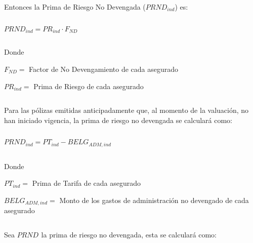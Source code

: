 \documentclass[11pt,twoside,openright,spanish]{report}
\numberwithin{equation}{chapter}
\numberwithin{figure}{chapter}
\numberwithin{table}{chapter}
\begin{document}
	
	\doublespacing

$ $

\doublespacing
	
	Entonces la Prima de Riesgo No Devengada ($PRND_{ind}$) es:
	
	\doublespacing

$ $

\doublespacing
	
		{\centering
		${PRND}_{ind}^{}={{PR}_{ind}\cdot F_{ND}}$
		\noindent
		
	}	
	
	\doublespacing

$ $

\doublespacing
	
	Donde
	
	\doublespacing
	
	 $F_{ND}=$ Factor de No Devengamiento de cada asegurado
	
	$PR_{ind}=$ Prima de Riesgo de cada asegurado 
	
	\doublespacing

$ $

\doublespacing
	
	Para las pólizas emitidas anticipadamente que, al momento de la valuación, no han iniciado vigencia, la prima de riesgo no devengada se calculará como:
	
	\doublespacing

$ $

\doublespacing
	
		{\centering
		${PRND}_{ind}^{}={{PT}_{ind}-BELG_{ADM,ind}}$
		\noindent
		
	}	
	
	
	\doublespacing

$ $

\doublespacing
	
	Donde
	
	\doublespacing
	
	$PT_{ind}=$ Prima de Tarifa de cada asegurado
	
	$BELG_{ADM,ind}=$ Monto de los gastos de administración no devengado de cada asegurado
	
	\doublespacing

$ $

\doublespacing
	
	Sea $PRND_{}$ la prima de riesgo no devengada, esta se calculará como:
	
	\doublespacing

$ $

\doublespacing
	
\end{document}
